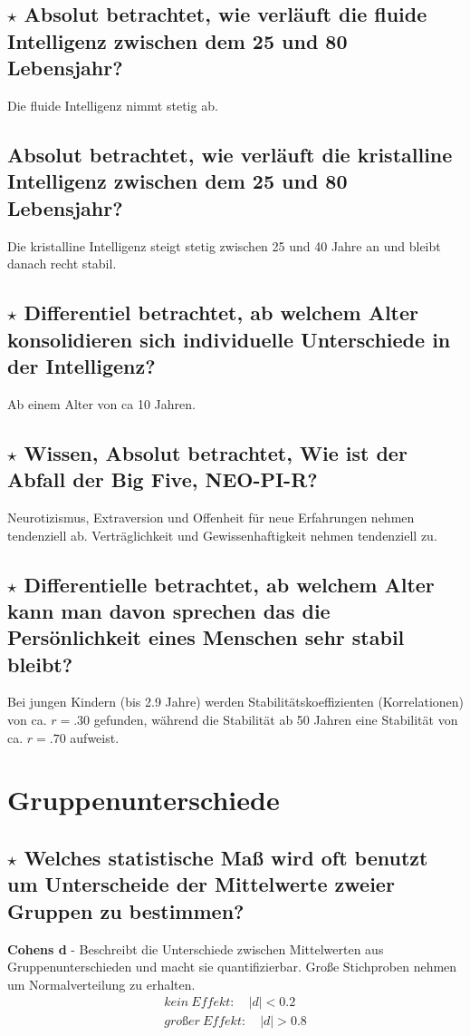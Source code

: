 \documentclass[a4paper,9pt,DIV=14]{scrartcl}
\begin{document}
\subsection{$\star$ Absolut betrachtet, wie verläuft die fluide Intelligenz zwischen dem 25 und 80 Lebensjahr?} %
Die fluide Intelligenz nimmt stetig ab.
\subsection{Absolut betrachtet, wie verläuft die kristalline Intelligenz zwischen dem 25 und 80 Lebensjahr?}
Die kristalline Intelligenz steigt stetig zwischen 25 und 40 Jahre an und bleibt danach recht stabil.
\subsection{$\star$ Differentiel betrachtet, ab welchem Alter konsolidieren sich individuelle Unterschiede in der Intelligenz?} %
Ab einem Alter von ca 10 Jahren.
\subsection{$\star$ Wissen, Absolut betrachtet, Wie ist der Abfall der Big Five, NEO-PI-R?} %
Neurotizismus, Extraversion und Offenheit für neue Erfahrungen nehmen tendenziell ab. Verträglichkeit und Gewissenhaftigkeit nehmen tendenziell zu.
\subsection{$\star$ Differentielle betrachtet, ab welchem Alter kann man davon sprechen das die Persönlichkeit eines Menschen sehr stabil bleibt?} %
Bei jungen Kindern (bis 2.9 Jahre) werden Stabilitätskoeffizienten (Korrelationen) von ca. $r = .30$ gefunden, während die Stabilität ab 50 Jahren eine Stabilität von ca. $r = .70$ aufweist.

\section{Gruppenunterschiede}

\subsection{$\star$ Welches statistische Maß wird oft benutzt um Unterscheide der Mittelwerte zweier Gruppen zu bestimmen?} %
\textbf{Cohens d} - Beschreibt die Unterschiede zwischen Mittelwerten aus Gruppenunterschieden und macht sie quantifizierbar. Große Stichproben nehmen um Normalverteilung zu erhalten.
\begin{align*}
kein\ Effekt: \quad |d| < 0.2 \\
großer\ Effekt: \quad |d| > 0.8
\end{align*}
\end{document}

